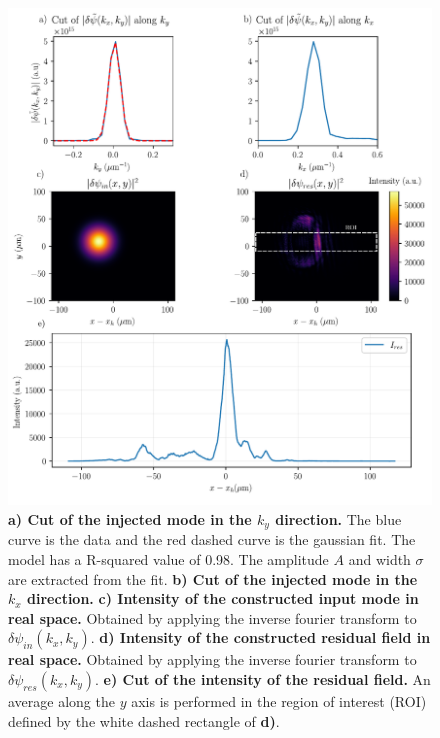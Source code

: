 \begin{figure}
    \centering
    \includegraphics[width=1\textwidth]{chap_stimulated_hawking/fig/fit_input_mode.pdf}
    \caption{\textbf{a) Cut of the injected mode in the $k_y$ direction.} The blue curve is the data and the red dashed curve is the gaussian fit. The model has a R-squared value of 0.98. The amplitude $A$ and width $\sigma$ are extracted from the fit. 
    \textbf{b) Cut of the injected mode in the $k_x$ direction.}
    \textbf{c) Intensity of the constructed input mode in real space.} Obtained by applying the inverse fourier transform to $\delta \psi_{in}(k_x,k_y)$.
    \textbf{d) Intensity of the constructed residual field in real space.} Obtained by applying the inverse fourier transform to $\delta \psi_{res}(k_x,k_y)$.
    \textbf{e) Cut of the intensity of the residual field.} An average along the $y$ axis is performed in the region of interest (ROI) defined by the white dashed rectangle of \textbf{d)}.}
    \label{fig:fit_input_mode}
\end{figure}


